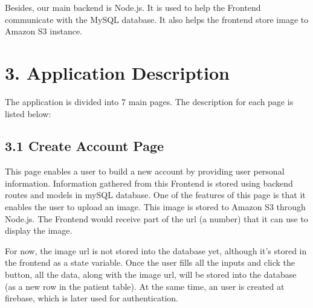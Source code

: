 \documentclass[]{book}
\begin{document}
Besides, our main backend is Node.js. It is used to help the Frontend
communicate with the MySQL database. It also helps the frontend store
image to Amazon S3 instance.

\section{3. Application Description}\label{application-description}

The application is divided into 7 main pages. The description for each
page is listed below:

\subsection{3.1 Create Account Page}\label{create-account-page}

This page enables a user to build a new account by providing user
personal information. Information gathered from this Frontend is stored
using backend routes and models in mySQL database. One of the features
of this page is that it enables the user to upload an image. This image
is stored to Amazon S3 through Node.js. The Frontend would receive part
of the url (a number) that it can use to display the image.

For now, the image url is not stored into the database yet, although
it's stored in the frontend as a state variable. Once the user fills all
the inputs and click the button, all the data, along with the image url,
will be stored into the database (as a new row in the patient table). At
the same time, an user is created at firebase, which is later used for
authentication.
\end{document}
